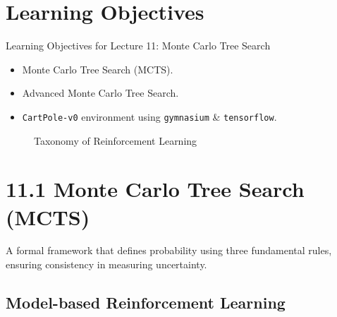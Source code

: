 \documentclass[
  letterpaper,
  DIV=11,
  numbers=noendperiod]{scrreprt}
\makeatletter
\providecommand{\tightlist}{%
  \setlength{\itemsep}{0pt}\setlength{\parskip}{0pt}}\usepackage{longtable,booktabs,array}
\newcommand*\pandocbounded[1]{%
  \sbox\pandoc@box{#1}%
  \Gscale@div\@tempa{\textheight}{\dimexpr\ht\pandoc@box+\dp\pandoc@box\relax}%
  \Gscale@div\@tempb{\linewidth}{\wd\pandoc@box}%
  \ifdim\@tempb\p@<\@tempa\p@\let\@tempa\@tempb\fi%
  \ifdim\@tempa\p@<\p@\scalebox{\@tempa}{\usebox\pandoc@box}%
  \else\usebox{\pandoc@box}%
  \fi%
}
\makeatother
\begin{document}
\chapter{Learning Objectives}\label{learning-objectives-9}

\begin{tcolorbox}[enhanced jigsaw, colback=white, left=2mm, breakable, opacityback=0, bottomrule=.15mm, rightrule=.15mm, arc=.35mm, colframe=quarto-callout-note-color-frame, leftrule=.75mm, toprule=.15mm]

Learning Objectives for Lecture 11: Monte Carlo Tree Search 🎯

\end{tcolorbox}

\begin{itemize}
\tightlist
\item
  Monte Carlo Tree Search (MCTS).
\item
  Advanced Monte Carlo Tree Search.
\item
  \texttt{CartPole-v0} environment using \texttt{gymnasium} \&
  \texttt{tensorflow}.
\end{itemize}

\begin{figure}[H]

{\centering \pandocbounded{}

}

\caption{Taxonomy of Reinforcement Learning}

\end{figure}%

\chapter{11.1 Monte Carlo Tree Search
(MCTS)}\label{monte-carlo-tree-search-mcts}

\begin{tcolorbox}[enhanced jigsaw, colback=white, left=2mm, breakable, opacityback=0, bottomrule=.15mm, rightrule=.15mm, arc=.35mm, colframe=quarto-callout-note-color-frame, leftrule=.75mm, toprule=.15mm]

A formal framework that defines probability using three fundamental
rules, ensuring consistency in measuring uncertainty. 🎲

\end{tcolorbox}

\section{Model-based Reinforcement
Learning}\label{model-based-reinforcement-learning}
\end{document}
